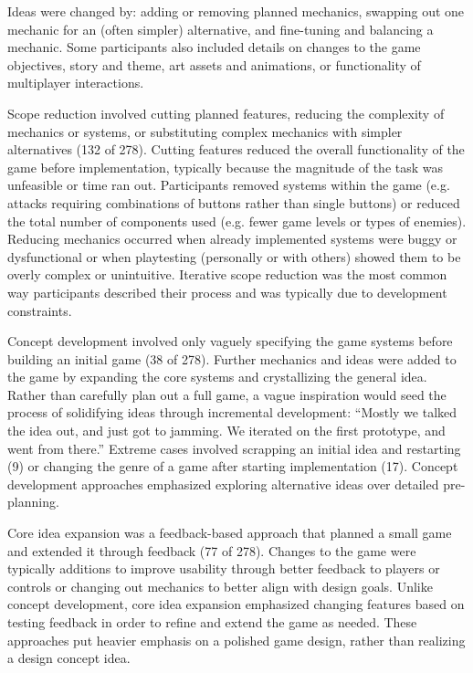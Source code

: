 \documentclass{sig-alternate}
\begin{document}
Ideas were changed by: adding or removing planned mechanics, swapping out one mechanic for an (often simpler) alternative, and fine-tuning and balancing a mechanic. Some participants also included details on changes to the game objectives, story and theme, art assets and animations, or functionality of multiplayer interactions.

Scope reduction involved cutting planned features, reducing the complexity of mechanics or systems, or substituting complex mechanics with simpler alternatives (132 of 278).
Cutting features reduced the overall functionality of the game before implementation, typically because the magnitude of the task was unfeasible or time ran out. Participants removed systems within the game (e.g. attacks requiring combinations of buttons rather than single buttons) or reduced the total number of components used (e.g. fewer game levels or types of enemies).
Reducing mechanics occurred when already implemented systems were buggy or dysfunctional or when playtesting (personally or with others) showed them to be overly complex or unintuitive. 
Iterative scope reduction was the most common way participants described their process and was typically due to development constraints.

Concept development involved only vaguely specifying the game systems before building an initial game (38 of 278). Further mechanics and ideas were added to the game by expanding the core systems and crystallizing the general idea.
Rather than carefully plan out a full game, a vague inspiration would seed the process of solidifying ideas through incremental development: ``Mostly we talked the idea out, and just got to jamming. We iterated on the first prototype, and went from there.''
Extreme cases involved scrapping an initial idea and restarting (9) or changing the genre of a game after starting implementation (17). Concept development approaches emphasized exploring alternative ideas over detailed pre-planning.

Core idea expansion was a feedback-based approach that planned a small game and extended it through feedback (77 of 278). Changes to the game were typically additions to improve usability through better feedback to players or controls or changing out mechanics to better align with design goals. Unlike concept development, core idea expansion emphasized changing features based on testing feedback in order to refine and extend the game as needed. These approaches put heavier emphasis on a polished game design, rather than realizing a design concept idea.
\end{document}
